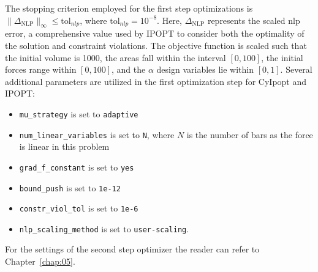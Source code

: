 The stopping criterion employed for the first step optimizations is $\|\Delta_{\text{NLP}}\|_\infty \leq \text{tol}_{nlp}$, where $\text{tol}_{nlp}=10^{-8}$. Here, $\Delta_{\text{NLP}}$ represents the scaled \gls{nlp} error, a comprehensive value used by IPOPT to consider both the optimality of the solution and constraint violations. The objective function is scaled such that the initial volume is 1000, the areas fall within the interval $[0,100]$, the initial forces range within $[0,100]$, and the $\alpha$ design variables lie within $[0,1]$. Several additional parameters are utilized in the first optimization step for CyIpopt and IPOPT:
\begin{itemize}
    \item \texttt{mu\_strategy} is set to \texttt{adaptive}
    \item \texttt{num\_linear\_variables} is set to \texttt{N}, where $N$ is the number of bars as the force is linear in this problem
    \item \texttt{grad\_f\_constant} is set to \texttt{yes}
    \item \texttt{bound\_push} is set to \texttt{1e-12}
    \item \texttt{constr\_viol\_tol} is set to \texttt{1e-6}
    \item \texttt{nlp\_scaling\_method} is set to \texttt{user-scaling}.
\end{itemize}
For the settings of the second step optimizer the reader can refer to Chapter~\ref{chap:05}.

